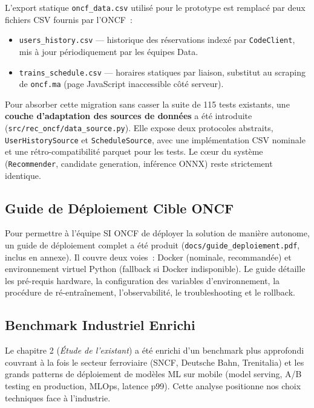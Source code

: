 \documentclass[12pt, a4paper]{report}
\begin{document}
L'export statique \texttt{oncf\_data.csv} utilisé pour le prototype est
remplacé par deux fichiers CSV fournis par l'ONCF~:

\begin{itemize}
\item \texttt{users\_history.csv} --- historique des réservations indexé
    par \texttt{CodeClient}, mis à jour périodiquement par les équipes Data.
\item \texttt{trains\_schedule.csv} --- horaires statiques par liaison,
    substitut au scraping de \texttt{oncf.ma} (page JavaScript inaccessible
    côté serveur).
\end{itemize}

Pour absorber cette migration sans casser la suite de 115 tests existants,
une \textbf{couche d'adaptation des sources de données} a été introduite
(\texttt{src/rec\_oncf/data\_source.py}). Elle expose deux protocoles
abstraits, \texttt{UserHistorySource} et \texttt{ScheduleSource}, avec une
implémentation CSV nominale et une rétro-compatibilité parquet pour les
tests. Le cœur du système (\texttt{Recommender}, candidate generation,
inférence ONNX) reste strictement identique.

\subsection{Guide de Déploiement Cible ONCF}

Pour permettre à l'équipe SI ONCF de déployer la solution de manière
autonome, un guide de déploiement complet a été produit
(\texttt{docs/guide\_deploiement.pdf}, inclus en annexe). Il couvre deux
voies~: Docker (nominale, recommandée) et environnement virtuel Python
(fallback si Docker indisponible). Le guide détaille les pré-requis
hardware, la configuration des variables d'environnement, la procédure de
ré-entraînement, l'observabilité, le troubleshooting et le rollback.

\subsection{Benchmark Industriel Enrichi}

Le chapitre 2 (\textit{Étude de l'existant}) a été enrichi d'un benchmark
plus approfondi couvrant à la fois le secteur ferroviaire (SNCF, Deutsche
Bahn, Trenitalia) et les grands patterns de déploiement de modèles ML sur
mobile (model serving, A/B testing en production, MLOps, latence p99).
Cette analyse positionne nos choix techniques face à l'industrie.
\end{document}
